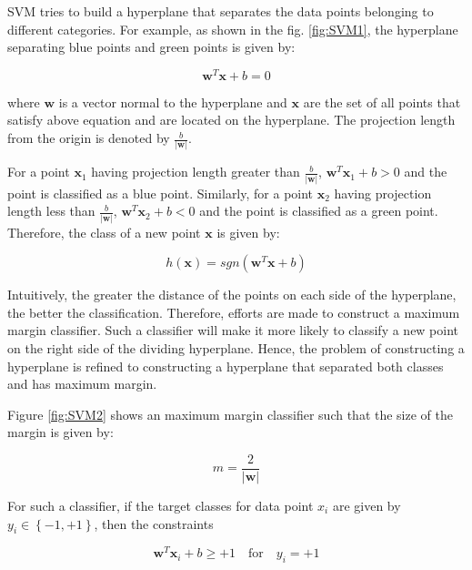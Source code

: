 %


SVM tries to build a hyperplane that separates the data points belonging to different categories. For example, as shown in the fig. \ref{fig:SVM1}, the hyperplane separating blue points and green points is given by:

$$
\mathbf{w}^{T}\mathbf{x} + b = 0
$$

where $\mathbf{w}$ is a vector normal to the hyperplane and $\mathbf{x}$ are the set of all points that satisfy above equation and are located on the hyperplane. The projection length from the origin is denoted by $\frac{b}{|\mathbf{w}|}$. 

For a point $\mathbf{x}_1$ having projection length greater than $\frac{b}{|\mathbf{w}|}$, $\mathbf{w}^{T}\mathbf{x}_1 + b > 0$ and the point is classified as a blue point. Similarly, for a point $\mathbf{x}_2$ having projection length less than $\frac{b}{|\mathbf{w}|}$, $\mathbf{w}^{T}\mathbf{x}_2 + b < 0$ and the point is classified as a green point. Therefore, the class of a new point $\mathbf{x}$ is given by:

$$
h(\mathbf{x}) = sgn(\mathbf{w}^{T}\mathbf{x} + b) \label{eq:sgn}
$$

Intuitively, the greater the distance of the points on each side of the hyperplane, the better the classification. Therefore, efforts are made to construct a maximum margin classifier.  Such a classifier will make it more likely to classify a new point on the right side of the dividing hyperplane. Hence, the problem of constructing a hyperplane is refined to constructing a hyperplane that separated both classes and has maximum margin.

Figure \ref{fig:SVM2} shows an maximum margin classifier such that the size of the margin is given by:

$$
m=\frac{2}{|\mathbf{w}|}
$$

For such a classifier, if the target classes for data point $x_i$ are given by $y_i \in \left\lbrace -1, +1 \right\rbrace$, then the constraints

$$
\mathbf{w}^{T}\mathbf{x}_i + b \geq +1 \quad \text{for} \quad y_i = +1
$$

